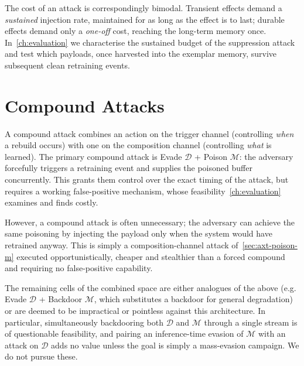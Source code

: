 The cost of an attack is correspondingly bimodal. Transient effects demand a \emph{sustained} injection rate, maintained for as long as the effect is to last; durable effects demand only a \emph{one-off} cost, reaching the long-term memory once. In~\cref{ch:evaluation} we characterise the sustained budget of the suppression attack and test which payloads, once harvested into the exemplar memory, survive subsequent clean retraining events.

\section{Compound Attacks}
\label{sec:axt-compound}
A compound attack combines an action on the trigger channel (controlling \emph{when} a rebuild occurs) with one on the composition channel (controlling \emph{what} is learned). The primary compound attack is Evade $\mathcal{D}$ + Poison $\mathcal{M}$: the adversary forcefully triggers a retraining event and supplies the poisoned buffer concurrently. This grants them control over the exact timing of the attack, but requires a working false-positive mechanism, whose feasibility~\cref{ch:evaluation} examines and finds costly.

However, a compound attack is often unnecessary; the adversary can achieve the same poisoning by injecting the payload only when the system would have retrained anyway. This is simply a composition-channel attack of~\cref{sec:axt-poison-m} executed opportunistically, cheaper and stealthier than a forced compound and requiring no false-positive capability.

The remaining cells of the combined space are either analogues of the above (e.g. Evade $\mathcal{D}$ + Backdoor $\mathcal{M}$, which substitutes a backdoor for general degradation) or are deemed to be impractical or pointless against this architecture. In particular, simultaneously backdooring both $\mathcal{D}$ and $\mathcal{M}$ through a single stream is of questionable feasibility, and pairing an inference-time evasion of $\mathcal{M}$ with an attack on $\mathcal{D}$ adds no value unless the goal is simply a mass-evasion campaign. We do not pursue these.

